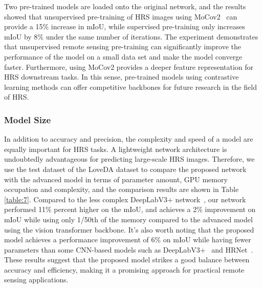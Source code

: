 \documentclass[journal]{IEEEtran}
\begin{document}
Two pre-trained models are loaded onto the original network, and the results showed that unsupervised pre-training of HRS images using MoCov2~\cite{he2020momentum}  can provide a 15\% increase in mIoU, while supervised pre-training only increases mIoU by 8\% under the same number of iterations. The experiment demonstrates that unsupervised remote sensing pre-training can significantly improve the performance of the model on a small data set and make the model converge faster. Furthermore, using MoCov2 provides a deeper feature representation for HRS downstream tasks. In this sense, pre-trained models using contrastive learning methods can offer competitive backbones for future research in the field of HRS.

\subsubsection{Model Size}
In addition to accuracy and precision, the complexity and speed of a model are equally important for HRS tasks. A lightweight network architecture is undoubtedly advantageous for predicting large-scale HRS images. Therefore, we use the test dataset of the LoveDA dataset to compare the proposed network with the advanced model in terms of parameter amount, GPU memory occupation and complexity, and the comparison results are shown in Table \ref{table:7}. Compared to the less complex DeepLabV3+ network~\cite{chen2018encoder}, our network performed 11\% percent higher on the mIoU, and achieves a 2\% improvement on mIoU while using only 1/50th of the memory compared to the advanced model using the vision transformer backbone. It’s also worth noting that the proposed model achieves a performance improvement of 6\% on mIoU while having fewer parameters than some CNN-based models such as DeepLabV3+~\cite{chen2018encoder} and HRNet~\cite{wang2020deep}. These results suggest that the proposed model strikes a good balance between accuracy and efficiency, making it a promising approach for practical remote sensing applications.
\end{document}
